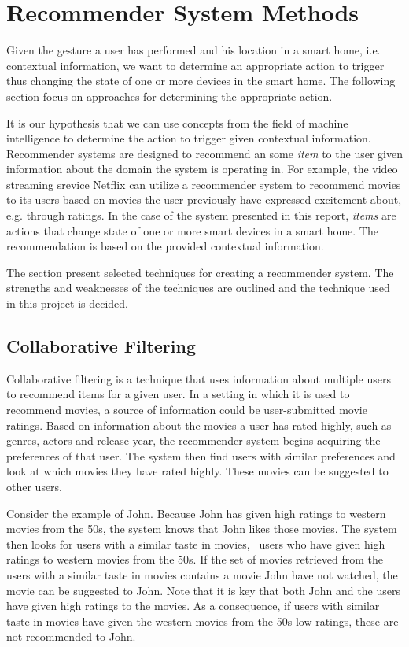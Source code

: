 \section{Recommender System Methods}
\label{sec:analysis:recommender-systems}

Given the gesture a user has performed and his location in a smart home, i.e. contextual information, we want to determine an appropriate action to trigger thus changing the state of one or more devices in the smart home. The following section focus on approaches for determining the appropriate action.

It is our hypothesis that we can use concepts from the field of machine intelligence to determine the action to trigger given contextual information. Recommender systems are designed to recommend an some \emph{item} to the user given information about the domain the system is operating in. For example, the video streaming srevice Netflix can utilize a recommender system to recommend movies to its users based on movies the user previously have expressed excitement about, e.g. through ratings.
In the case of the system presented in this report, \emph{items} are actions that change state of one or more smart devices in a smart home. The recommendation is based on the provided contextual information.

The section present selected techniques for creating a recommender system. The strengths and weaknesses of the techniques are outlined and the technique used in this project is decided.

\subsection{Collaborative Filtering}
\label{sec:analysis:recommender-methods:collaborative-filtering}

Collaborative filtering is a technique that uses information about multiple users to recommend items for a given user.
In a setting in which it is used to recommend movies, a source of information could be user-submitted movie ratings.
Based on information about the movies a user has rated highly, such as genres, actors and release year, the recommender system begins acquiring the preferences of that user.
The system then find users with similar preferences and look at which movies they have rated highly. These movies can be suggested to other users.

Consider the example of John. Because John has given high ratings to western movies from the 50s, the system knows that John likes those movies. The system then looks for users with a similar taste in movies, \ie~users who have given high ratings to western movies from the 50s. If the set of movies retrieved from the users with a similar taste in movies contains a movie John have not watched, the movie can be suggested to John. Note that it is key that both John and the users have given high ratings to the movies. As a consequence, if users with similar taste in movies have given the western movies from the 50s low ratings, these are not recommended to John.

